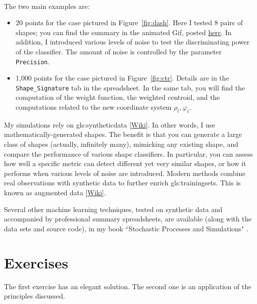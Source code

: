 \documentclass[oneside,10pt]{book}
\begin{document}
\vspace{1ex}\\
The two main examples are:
\begin{itemize}
\item 20 points for the case pictured in Figure~\ref{fig:dash}. Here I tested 8 pairs of shapes; you can find the summary in the animated Gif, posted
\href{https://mltechniques.com/2022/04/20/computer-vision-shape-classification-via-explainable-ai/}{here}. In addition, I introduced various levels of noise to test the discriminating power of the classifier. The amount of noise is controlled by the parameter \texttt{Precision}.
\item 1,000 points for the case pictured in Figure~\ref{fig:ctr}. Details are in the \texttt{Shape\_Signature} tab in the spreadsheet. In the same tab, you will find the computation of the weight function, the weighted centroid, and the computations related to the new coordinate system $\rho_t,\varphi_t$.
\end{itemize}
My simulations rely on \gls{gls:syntheticdata} [\href{https://en.wikipedia.org/wiki/Synthetic_data}{Wiki}]. In other words, I use mathematically-generated shapes. The benefit is that you can generate a large class of shapes (actually, infinitely many), mimicking any existing shape, and compare the performance of various shape classifiers.
In particular, you can assess how well a specific metric can detect different yet very similar shapes, or how it performs when various levels of noise are introduced. Modern methods combine real observations with synthetic data to further enrich \glspl{gls:trainingset}. This is known as \textcolor{index}{augmented data} [\href{https://en.wikipedia.org/wiki/Data_augmentation}{Wiki}].

Several other machine learning techniques, tested on synthetic data and accompanied by professional summary spreadsheets, are available (along with the data sets and source code), in my book ``Stochastic Processes and Simulations" \cite{vgsimulnew}.

\section{Exercises}

The first exercise has an elegant solution. The second one is an application of the principles discussed.
\end{document}
